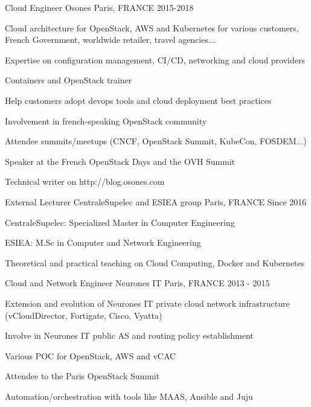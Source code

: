 \begin{cventries}
  \cventry
    {Cloud Engineer} %
    {Osones} %
    {Paris, FRANCE} %
    {2015-2018} %
    {
      \begin{cvitems} %
      \item {Cloud architecture for OpenStack, AWS and Kubernetes for various
       customers, French Government, worldwide retailer, travel agencies...}
      \item {Expertise on configuration management, CI/CD, networking and cloud
       providers}
      \item {Containers and OpenStack trainer}
      \item {Help customers adopt devops tools and cloud deployment best
       practices}
      \item {Involvement in french-speaking OpenStack community}
      \item {Attendee summits/meetups (CNCF, OpenStack Summit, KubeCon, FOSDEM...)}
      \item {Speaker at the French OpenStack Days and the OVH Summit}
      \item {Technical writer on http://blog.osones.com}
      \end{cvitems}
    }

  \cventry
    {External Lecturer} %
    {CentraleSupelec and ESIEA group}
    {Paris, FRANCE} %
    {Since 2016} %
    {
      \begin{cvitems} %
        \item {CentraleSupelec: Specialized Master in Computer Engineering}
        \item {ESIEA: M.Sc in Computer and Network Engineering}
        \item {Theoretical and practical teaching on Cloud Computing, Docker
          and Kubernetes}
      \end{cvitems}
    }
  \cventry
    {Cloud and Network Engineer}
    {Neurones IT} %
    {Paris, FRANCE} %
    {2013 - 2015} %
    {
      \begin{cvitems} %
        \item {Extension and evolution of Neurones IT private cloud
          network infrastructure (vCloudDirector, Fortigate, Cisco, Vyatta)}
        \item {Involve in Neurones IT public AS and routing policy
          establishment}
        \item {Various POC for OpenStack, AWS and vCAC}
        \item {Attendee to the Paris OpenStack Summit}
        \item {Automation/orchestration with tools like MAAS, Ansible and Juju}
      \end{cvitems}
    }

\end{cventries}
